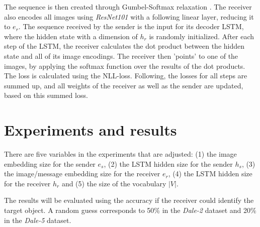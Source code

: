 \documentclass[11pt]{article}
\begin{document}
The sequence is then created through Gumbel-Softmax relaxation \citep{Jang2016}.
%
The receiver also encodes all images using \emph{ResNet101} with a following linear layer, reducing it to $e_r$.
The sequence received by the sender is the input for its decoder LSTM, where the hidden state with a dimension of $h_r$ is randomly initialized.
After each step of the LSTM, the receiver calculates the dot product between the hidden state and all of its image encodings.
The receiver then 'points' to one of the images, by applying the softmax function over the results of the dot products.
The loss is calculated using the NLL-loss.
Following, the losses for all steps are summed up, and all weights of the receiver as well as the sender are updated, based on this summed loss.



\section{Experiments and results}

There are five variables in the experiments that are adjusted:
(1) the image embedding size for the sender $e_s$, (2) the LSTM hidden size for the sender $h_s$, (3) the image/message embedding size for the receiver $e_r$, (4) the LSTM hidden size for the receiver $h_r$ and (5) the size of the vocabulary $|V|$.

The results will be evaluated using the accuracy if the receiver could identify the target object.
A random guess corresponds to 50\% in the \emph{Dale-2} dataset and 20\% in the \emph{Dale-5} dataset.


\end{document}
